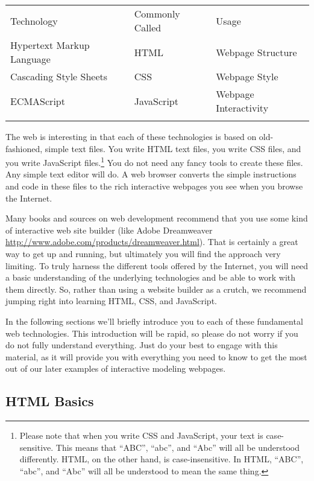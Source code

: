 \documentclass[]{memoir}
\begin{document}
\begin{longtable}[c]{@{}lll@{}}
\hline\noalign{\medskip}
Technology & Commonly Called & Usage
\\\noalign{\medskip}
\hline\noalign{\medskip}
Hypertext Markup Language & HTML & Webpage Structure
\\\noalign{\medskip}
Cascading Style Sheets & CSS & Webpage Style
\\\noalign{\medskip}
ECMAScript & JavaScript & Webpage Interactivity
\\\noalign{\medskip}
\hline
\end{longtable}

The web is interesting in that each of these technologies is based on
old-fashioned, simple text files. You write HTML text files, you write
CSS files, and you write JavaScript files.\footnote{Please note that
  when you write CSS and JavaScript, your text is case-sensitive. This
  means that ``ABC'', ``abc'', and ``Abc'' will all be understood
  differently. HTML, on the other hand, is case-insensitive. In HTML,
  ``ABC'', ``abc'', and ``Abc'' will all be understood to mean the same
  thing.} You do not need any fancy tools to create these files. Any
simple text editor will do. A web browser converts the simple
instructions and code in these files to the rich interactive webpages
you see when you browse the Internet.

Many books and sources on web development recommend that you use some
kind of interactive web site builder (like Adobe Dreamweaver
\url{http://www.adobe.com/products/dreamweaver.html}). That is certainly
a great way to get up and running, but ultimately you will find the
approach very limiting. To truly harness the different tools offered by
the Internet, you will need a basic understanding of the underlying
technologies and be able to work with them directly. So, rather than
using a website builder as a crutch, we recommend jumping right into
learning HTML, CSS, and JavaScript.

In the following sections we'll briefly introduce you to each of these
fundamental web technologies. This introduction will be rapid, so please
do not worry if you do not fully understand everything. Just do your
best to engage with this material, as it will provide you with
everything you need to know to get the most out of our later examples of
interactive modeling webpages.

\subsection{HTML Basics}
\end{document}
